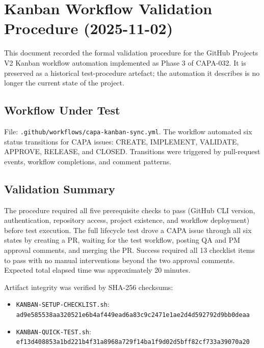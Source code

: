 
\section{Kanban Workflow Validation Procedure (2025-11-02)}

This document recorded the formal validation procedure for the GitHub Projects V2
Kanban workflow automation implemented as Phase 3 of CAPA-032. It is preserved as a
historical test-procedure artefact; the automation it describes is no longer the
current state of the project.

\subsection{Workflow Under Test}

File: \texttt{.github/workflows/capa-kanban-sync.yml}. The workflow automated six
status transitions for CAPA issues: CREATE, IMPLEMENT, VALIDATE, APPROVE, RELEASE,
and CLOSED. Transitions were triggered by pull-request events, workflow completions,
and comment patterns.

\subsection{Validation Summary}

The procedure required all five prerequisite checks to pass (GitHub CLI version,
authentication, repository access, project existence, and workflow deployment) before
test execution. The full lifecycle test drove a CAPA issue through all six states by
creating a PR, waiting for the test workflow, posting QA and PM approval comments, and
merging the PR. Success required all 13 checklist items to pass with no manual
interventions beyond the two approval comments. Expected total elapsed time was
approximately 20 minutes.

Artifact integrity was verified by SHA-256 checksums:
\begin{itemize}
  \item \texttt{KANBAN-SETUP-CHECKLIST.sh}: \texttt{ad9e585538aa320521e6b4af449ead6a83c9c2471e1ae2d4d592792d9bb0deaa}
  \item \texttt{KANBAN-QUICK-TEST.sh}: \texttt{ef13d408853a1bd221b4f31a8968a729f14ba1f9d02d5bff82cf733a39070a20}
\end{itemize}

